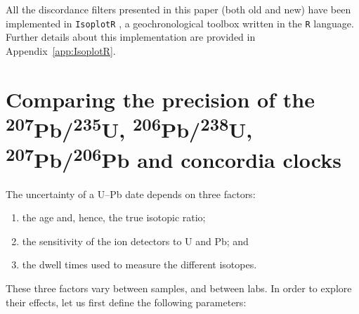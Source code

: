 \documentclass[gchron, manuscript]{copernicus}
\begin{document}
All the discordance filters presented in this paper (both old and new)
have been implemented in \texttt{IsoplotR} \citep{vermeesch2018c}, a
geochronological toolbox written in the \texttt{R} language. Further
details about this implementation are provided in
Appendix~\ref{app:IsoplotR}.












\appendix

\section{Comparing the precision of the
  \textsuperscript{207}Pb/\textsuperscript{235}U,
  \textsuperscript{206}Pb/\textsuperscript{238}U,
  \textsuperscript{207}Pb/\textsuperscript{206}Pb and concordia
  clocks}\label{app:synthetics}

The uncertainty of a U--Pb date depends on three factors:

\begin{enumerate}
\item the age and, hence, the true isotopic ratio;
\item the sensitivity of the ion detectors to U and Pb; and
\item the dwell times used to measure the different isotopes.
\end{enumerate}

These three factors vary between samples, and between labs.  In order
to explore their effects, let us first define the following
parameters:
\end{document}
